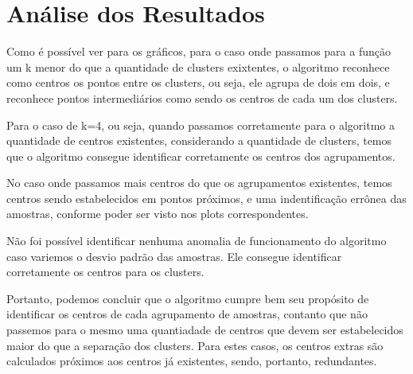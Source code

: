 \documentclass[12pt,a4paper,titlepage]{article}
\begin{document}
\section{Análise dos Resultados}

Como é possível ver para os gráficos, para o caso onde passamos para a função um k menor do que a quantidade de clusters exixtentes, o algoritmo reconhece como centros os pontos entre os clusters, ou seja, ele agrupa de dois em dois, e reconhece pontos intermediários como sendo os centros de cada um dos clusters.

Para o caso de k=4, ou seja, quando passamos corretamente para o algoritmo a quantidade de centros existentes, considerando a quantidade de clusters, temos que o algoritmo consegue identificar corretamente os centros dos agrupamentos.

No caso onde passamos mais centros do que os agrupamentos existentes, temos centros sendo estabelecidos em pontos próximos, e uma indentificação errônea das amostras, conforme poder ser visto nos plots correspondentes.

Não foi possível identificar nenhuma anomalia de funcionamento do algoritmo caso variemos o desvio padrão das amostras. Ele consegue identificar corretamente os centros para os clusters.

Portanto, podemos concluir que o algoritmo cumpre bem seu propósito de identificar os centros de cada agrupamento de amostras, contanto que não passemos para o mesmo uma quantiadade de centros que devem ser estabelecidos maior do que a separação dos clusters. Para estes casos, os centros extras são calculados próximos aos centros já existentes, sendo, portanto, redundantes.
\end{document}
